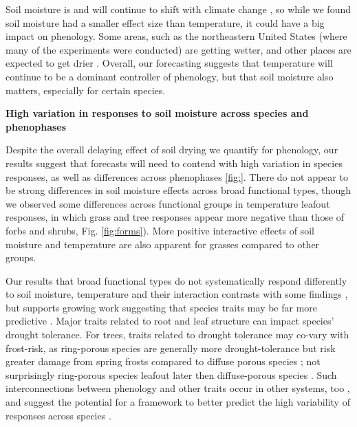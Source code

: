 \documentclass{article}
\begin{document}
\par Soil moisture is and will continue to shift with climate change \citep{berg2017}, so while we found soil moisture had a smaller effect size than temperature, it could have a big impact on phenology. Some areas, such as the northeastern United States (where many of the experiments were conducted) are getting wetter, and other places are expected to get drier \citep{berg2017}. Overall, our forecasting suggests that temperature will continue to be a dominant controller of phenology, but that soil moisture also matters, especially for certain species. 
\par \textbf {High variation in responses to soil moisture across species and phenophases}
\par Despite the overall delaying effect of soil drying we quantify for phenology, our results suggest that forecasts will need to contend with high variation in species responses, as well as differences across phenophases \ref{fig:}. There do not appear to be strong differences in soil moisture effects across broad functional types, though we observed some differences across functional groups in temperature leafout responses, in which grass and tree responses appear more negative than those of forbs and shrubs, Fig. \ref{fig:forms}). More positive interactive effects of soil moisture and temperature are also apparent for grasses compared to other groups.  
\par Our results that broad functional types do not systematically respond differently to soil moisture, temperature and their interaction contrasts with some findings \citep[e.g.,][]{rollinson2012,castillioni2022effects}, but supports growing work suggesting that species traits may be far more predictive \cite[e.g., ][]{diaz2016global}. Major traits related to root and leaf structure can impact species' drought tolerance. For trees, traits related to drought tolerance may co-vary with frost-risk, as ring-porous species are generally more drought-tolerance but risk greater damage from spring frosts compared to diffuse porous species \citep{bader2022less,wang2022contrast}; not surprisingly ring-porous species leafout later then diffuse-porous species \cite{lechowicz1984}. Such interconnections between phenology and other traits occur in other systems, too \citep[e.g.,][]{ocheltree2020identification}, and suggest the potential for a framework to better predict the high variability of responses across species \citep[e.g.,][]{morales2024phylogenetic}.
\end{document}
